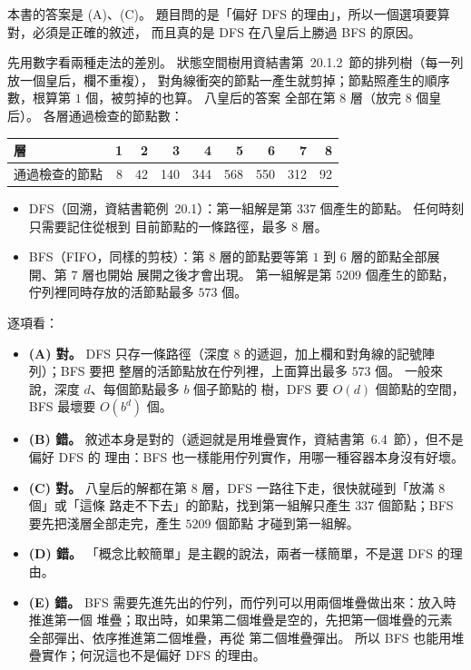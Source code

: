 \begin{pastsoln}
本書的答案是 (A)、(C)。 題目問的是「偏好 DFS 的理由」，所以一個選項要算對，必須是正確的敘述，
而且真的是 DFS 在八皇后上勝過 BFS 的原因。

先用數字看兩種走法的差別。 狀態空間樹用資結書第~20.1.2~節的排列樹（每一列放一個皇后，欄不重複），
對角線衝突的節點一產生就剪掉；節點照產生的順序數，根算第 $1$ 個，被剪掉的也算。 八皇后的答案
全部在第 $8$ 層（放完 $8$ 個皇后）。 各層通過檢查的節點數：
\begin{center}
\begin{tabular}{l*{8}{r}}
\toprule
層 & 1 & 2 & 3 & 4 & 5 & 6 & 7 & 8 \\
\midrule
通過檢查的節點 & 8 & 42 & 140 & 344 & 568 & 550 & 312 & 92 \\
\bottomrule
\end{tabular}
\end{center}

\begin{itemize}
\item DFS（回溯，資結書範例~20.1）：第一組解是第 $337$ 個產生的節點。 任何時刻只需要記住從根到
目前節點的一條路徑，最多 $8$ 層。
\item BFS（FIFO，同樣的剪枝）：第 $8$ 層的節點要等第 $1$ 到 $6$ 層的節點全部展開、第 $7$ 層也開始
展開之後才會出現。 第一組解是第 $5209$ 個產生的節點，佇列裡同時存放的活節點最多 $573$ 個。
\end{itemize}

逐項看：
\begin{itemize}
\item \textbf{(A) 對。} DFS 只存一條路徑（深度 $8$ 的遞迴，加上欄和對角線的記號陣列）；BFS 要把
整層的活節點放在佇列裡，上面算出最多 $573$ 個。 一般來說，深度 $d$、每個節點最多 $b$ 個子節點的
樹，DFS 要 $O(d)$ 個節點的空間，BFS 最壞要 $O(b^d)$ 個。
\item \textbf{(B) 錯。} 敘述本身是對的（遞迴就是用堆疊實作，資結書第~6.4~節），但不是偏好 DFS 的
理由：BFS 也一樣能用佇列實作，用哪一種容器本身沒有好壞。
\item \textbf{(C) 對。} 八皇后的解都在第 $8$ 層，DFS 一路往下走，很快就碰到「放滿 $8$ 個」或「這條
路走不下去」的節點，找到第一組解只產生 $337$ 個節點；BFS 要先把淺層全部走完，產生 $5209$ 個節點
才碰到第一組解。
\item \textbf{(D) 錯。} 「概念比較簡單」是主觀的說法，兩者一樣簡單，不是選 DFS 的理由。
\item \textbf{(E) 錯。} BFS 需要先進先出的佇列，而佇列可以用兩個堆疊做出來：放入時推進第一個
堆疊；取出時，如果第二個堆疊是空的，先把第一個堆疊的元素全部彈出、依序推進第二個堆疊，再從
第二個堆疊彈出。 所以 BFS 也能用堆疊實作；何況這也不是偏好 DFS 的理由。
\end{itemize}
\end{pastsoln}
